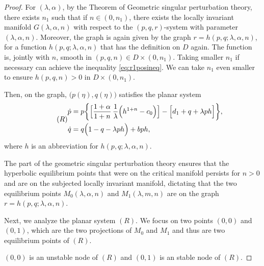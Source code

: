 \documentclass[a4paper,11pt]{article}
\def\dpp{\dot{p}}
\def\dqq{\dot{q}}
\begin{document}
\smallskip
\noindent
\begin{proof}
{}
\medskip
For $(\lambda,\alpha)$, by the Theorem of Geometric singular perturbation theory, there exists $n_1$ such that if $n\in(0,n_1)$, there exists the locally invariant manifold $G(\lambda,\alpha,n)$ with respect to the $(p,q,r)$-system with parameter $(\lambda,\alpha,n)$. Moreover, the graph is again given by the graph $r=h(p,q;\lambda,\alpha,n)$, for a function $h(p,q;\lambda,\alpha,n)$ that has the definition on $D$ again. The function is, jointly with $n$, smooth in $(p,q,n) \in D\times(0,n_1)$. Taking smaller $n_1$ if necessary can achieve the inequality \eqref{eq:r1posineq}. We can take $n_1$ even smaller to ensure $h(p,q,n)>0$ in $D\times(0,n_1)$.


Then, on the graph, $\big(p(\eta),q(\eta)\big)$ satisfies the planar system
\begin{equation} \tag*{(${R}$)} \label{eq:reduced}
\begin{aligned}
 {\dpp}&=p\bigg\{\Big[\frac{1+\alpha}{1+n}\,\frac{1}{\lambda }\Big(h^{1+n}-c_0\Big)\Big] -\Big[d_1 + q + \lambda ph\Big]\bigg\},\\
 {\dqq}&=q\Big(1-q-\lambda p h\Big) + bph,\\
\end{aligned}
\end{equation}
where $h$ is an abbreviation for $h(p,q;\lambda,\alpha,n)$.

The part of the geometric singular perturbation theory ensures that the hyperbolic equilibrium points that were on the critical manifold persists for $n>0$ and are on the subjected locally invariant manifold, dictating that the two equilibrium points $M_0(\lambda,\alpha,n)$ and $M_1(\lambda,m,n)$ are on the graph $r=h(p,q;\lambda,\alpha,n)$. 

Next, we analyze the planar system $(R)$. We focus on two points $(0,0)$ and $(0,1)$, which are the two projections of $M_0$ and $M_1$ and thus are two equilibrium points of $(R)$.

\medskip
{}
$(0,0)$ is an unstable node of $(R)$ and $(0,1)$ is an stable node of $(R)$. 
\medskip


\end{proof}
\end{document}
